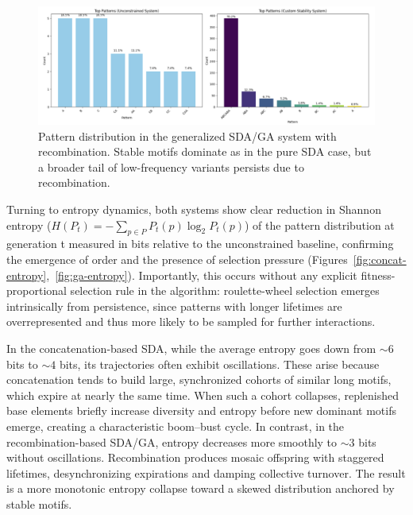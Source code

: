 \documentclass[life,article,submit,pdftex,moreauthors]{Definitions/mdpi}
\begin{document}
\begin{figure}[H]
    \centering
    \includegraphics[width=1\textwidth]{SDA-GA-patterns.png}
    \caption{Pattern distribution in the generalized SDA/GA system with recombination. Stable motifs dominate as in the pure SDA case, but a broader tail of low-frequency variants persists due to recombination.}
    \label{fig:ga-patterns}
\end{figure}

Turning to entropy dynamics, both systems show clear reduction in Shannon entropy ($H(P_t) = - \sum_{p \in P} P_t(p) \log_2 P_t(p)$) of
the pattern distribution at generation t measured in bits relative to the unconstrained baseline, confirming the emergence of order and the presence of selection pressure (Figures~\ref{fig:concat-entropy},~\ref{fig:ga-entropy}). Importantly, this occurs without any explicit fitness-proportional selection rule in the algorithm: roulette-wheel selection emerges intrinsically from persistence, since patterns with longer lifetimes are overrepresented and thus more likely to be sampled for further interactions.

In the concatenation-based SDA, while the average entropy goes down from $\sim6$ bits to $\sim4$ bits, its trajectories often exhibit oscillations. These arise because concatenation tends to build large, synchronized cohorts of similar long motifs, which expire at nearly the same time. When such a cohort collapses, replenished base elements briefly increase diversity and entropy before new dominant motifs emerge, creating a characteristic boom–bust cycle. In contrast, in the recombination-based SDA/GA, entropy decreases more smoothly to $\sim3$ bits without oscillations. Recombination produces mosaic offspring with staggered lifetimes, desynchronizing expirations and damping collective turnover. The result is a more monotonic entropy collapse toward a skewed distribution anchored by stable motifs.
\end{document}
